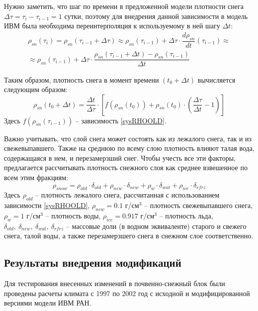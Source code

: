 \documentclass[a4paper, fontsize=14pt]{scrartcl}
\begin{document}
Нужно заметить, что шаг по времени в предложенной модели плотности снега $\Delta \tau = \tau_{i} - \tau_{i-1} = 1$ сутки, поэтому для внедрения данной зависимости в модель ИВМ была необходима переинтерполяция к используемому в ней шагу $\Delta t$:
\begin{eqnarray}
    \rho_{sn}(\tau_i) = \rho_{sn}(\tau_{i-1} + \Delta \tau) \approx \rho_{sn}(\tau_{i-1}) + \Delta \tau \cdot \dfrac{d \rho_{sn}}{dt}(\tau_{i-1}) \approx 
     \nonumber \\
    \approx \rho_{sn}(\tau_{i-1}) + \Delta \tau \cdot \dfrac{\rho_{sn}(\tau_{i-1} + \Delta t) - \rho_{sn}(\tau_{i-1})}{\Delta t}   
\end{eqnarray}

Таким образом, плотность снега в момент времени $(t_0 + \Delta t)$ вычисляется следующим образом:
\begin{equation}
    \rho_{sn}(t_0 + \Delta t) = \dfrac{\Delta t}{\Delta \tau} \cdot \left[ f(\rho_{sn}(t_0)) + \rho_{sn}(t_0) \cdot ( \dfrac{\Delta \tau}{\Delta t} - 1 ) \right]
\end{equation}
Здесь $f(\rho_{sn}(\tau_{i-1}))$ -- зависимость \eqref{sysRHOOLD}.     

\newpage
Важно учитывать, что слой снега может состоять как из лежалого снега, так и из свежевыпавшего. Также на среднюю по всему слою плотность влияют талая вода, содержащаяся в нем, и перезамерзший снег. Чтобы учесть все эти факторы, предлагается рассчитывать плотность снежного слоя как среднее взвешенное по всем этим фракциям:
\begin{equation}
    \rho_{snow} = \rho_{old} \cdot \delta_{old} + \rho_{new} \cdot \delta_{new} + \rho_{w} \cdot \delta_{wat} + \rho_{ice} \cdot \delta_{rfrz}
\end{equation}
Здесь $\rho_{old}$ -- плотность лежалого снега, рассчитанная с использованием зависимости \eqref{sysRHOOLD},  $\rho_{new} = 0.1$ г/см$^3$ -- плотность свежевыпавшего снега, $\rho_{w} = 1$ г/см$^3$ -- плотность воды, $\rho_{ice} = 0.917$ г/см$^3$ -- плотность льда, $\delta_{old}, ~\delta_{new}, ~\delta_{wat}, ~\delta_{rfrz}$ -- массовые доли (в водном эквиваленте) старого и свежего снега, талой воды, а также перезамерзшего снега в снежном слое соответственно.


\subsection{Результаты внедрения модификаций}

Для тестирования внесенных изменений в почвенно-снежный блок были проведены расчеты климата с 1997 по 2002 год с исходной и модифицированной версиями модели ИВМ РАН. 
\end{document}
